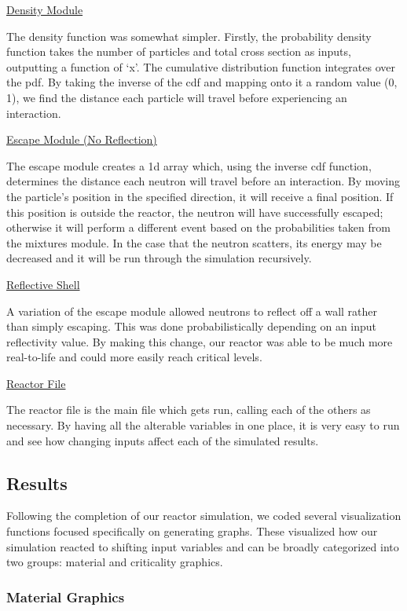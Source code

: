 \documentclass{notes}
\begin{document}
\ul{Density Module}

The density function was somewhat simpler. Firstly, the probability density function takes the number of particles and total cross section as inputs, outputting a function of `x'. The cumulative distribution function integrates over the pdf. By taking the inverse of the cdf and mapping onto it a random value (0, 1), we find the distance each particle will travel before experiencing an interaction. \cite{OpenMC}

\ul{Escape Module (No Reflection)}

The escape module creates a 1d array which, using the inverse cdf function, determines the distance each neutron will travel before an interaction. By moving the particle's position in the specified direction, it will receive a final position. If this position is outside the reactor, the neutron will have successfully escaped; otherwise it will perform a different event based on the probabilities taken from the mixtures module. In the case that the neutron scatters, its energy may be decreased and it will be run through the simulation recursively.

\ul{Reflective Shell}

A variation of the escape module allowed neutrons to reflect off a wall rather than simply escaping. This was done probabilistically depending on an input reflectivity value. By making this change, our reactor was able to be much more real-to-life and could more easily reach critical levels.

\ul{Reactor File}

The reactor file is the main file which gets run, calling each of the others as necessary. By having all the alterable variables in one place, it is very easy to run and see how changing inputs affect each of the simulated results.

\subsection*{Results}

Following the completion of our reactor simulation, we coded several visualization functions focused specifically on generating graphs. These visualized how our simulation reacted to shifting input variables and can be broadly categorized into two groups: material and criticality graphics.

\subsubsection*{Material Graphics}
\end{document}
